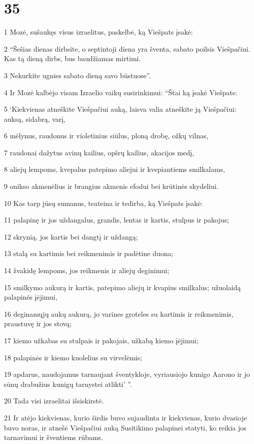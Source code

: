 \chapter{35}


\par 1 Mozė, sušaukęs visus izraelitus, paskelbė, ką Viešpats įsakė: 
\par 2 “Šešias dienas dirbsite, o septintoji diena yra šventa, sabato poilsis Viešpačiui. Kas tą dieną dirbs, bus baudžiamas mirtimi. 
\par 3 Nekurkite ugnies sabato dieną savo būstuose”. 
\par 4 Ir Mozė kalbėjo visam Izraelio vaikų susirinkimui: “Štai ką įsakė Viešpats: 
\par 5 ‘Kiekvienas atneškite Viešpačiui auką, laisva valia atneškite ją Viešpačiui: auksą, sidabrą, varį, 
\par 6 mėlynus, raudonus ir violetinius siūlus, ploną drobę, ožkų vilnas, 
\par 7 raudonai dažytus avinų kailius, opšrų kailius, akacijos medį, 
\par 8 aliejų lempoms, kvepalus patepimo aliejui ir kvepiantiems smilkalams, 
\par 9 onikso akmenėlius ir brangius akmenis efodui bei krūtinės skydeliui. 
\par 10 Kas tarp jūsų sumanus, teateina ir tedirba, ką Viešpats įsakė: 
\par 11 palapinę ir jos uždangalus, grandis, lentas ir kartis, stulpus ir pakojus; 
\par 12 skrynią, jos kartis bei dangtį ir uždangą; 
\par 13 stalą su kartimis bei reikmenimis ir padėtine duona; 
\par 14 žvakidę lempoms, jos reikmenis ir aliejų deginimui; 
\par 15 smilkymo aukurą ir kartis, patepimo aliejų ir kvapius smilkalus; užuolaidą palapinės įėjimui, 
\par 16 deginamųjų aukų aukurą, jo varines groteles su kartimis ir reikmenimis, praustuvę ir jos stovą; 
\par 17 kiemo užkabas su stulpais ir pakojais, užkabą kiemo įėjimui; 
\par 18 palapinės ir kiemo kuolelius su virvelėmis; 
\par 19 apdarus, naudojamus tarnaujant šventykloje, vyriausiojo kunigo Aarono ir jo sūnų drabužius kunigų tarnystei atlikti’ ”. 
\par 20 Tada visi izraelitai išsiskirstė. 
\par 21 Ir atėjo kiekvienas, kurio širdis buvo sujaudinta ir kiekvienas, kurio dvasioje buvo noras, ir atnešė Viešpačiui auką Susitikimo palapinei statyti, ko reikia jos tarnavimui ir šventiems rūbams. 
